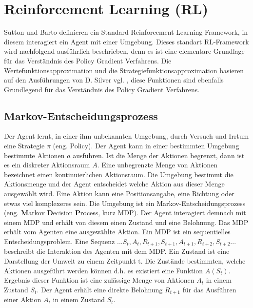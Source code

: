\documentclass[conference]{IEEEtran}
\begin{document}



\section{Reinforcement Learning (RL)}
Sutton und Barto \cite{sutton_barto_12} definieren ein Standard Reinforcement Learning Framework, in diesem interagiert ein Agent mit einer Umgebung. Dieses standart RL-Framework wird nachfolgend ausführlich beschrieben, denn es ist eine elementare Grundlage für das Verständnis des Policy Gradient Verfahrens. Die Wertefunktionsapproximation und die Strategiefunktionsapproximation basieren auf den Ausführungen von D. Silver vgl. \cite{silver_15}, diese Funktionen sind ebenfalls Grundlegend für das Verständnis des Policy Gradient Verfahrens.

\subsection{Markov-Entscheidungsprozess}
Der Agent lernt, in einer ihm unbekannten Umgebung, durch Versuch und Irrtum eine Strategie $\pi$ (eng. Policy). Der Agent kann in einer bestimmten Umgebung bestimmte Aktionen $a$ ausführen. Ist die Menge der Aktionen begrenzt, dann ist es ein diskreter Aktionsraum $A$. Eine unbegrenzte Menge von Aktionen bezeichnet einen kontinuierlichen Aktionsraum. Die Umgebung bestimmt die Aktionsmenge und der Agent entscheidet welche Aktion aus dieser Menge ausgewählt wird. Eine Aktion kann eine Positionsangabe, eine Richtung oder etwas viel komplexeres sein. Die Umgebung ist ein Markov-Entscheidungsprozess (eng. \textbf{M}arkov \textbf{D}ecision \textbf{P}rocess, kurz MDP). Der Agent interagiert demnach mit einem MDP und erhält von diesem einen Zustand und eine Belohnung. Das MDP erhält vom Agenten eine ausgewählte Aktion. Ein MDP ist ein sequentielles Entscheidungsproblem. Eine Sequenz $... S_t, A_t, R_{t+1}, S_{t+1}, A_{t+1}, R_{t+2}, S_{t+2} ...$ beschreibt die Interaktion des Agenten mit dem MDP. Ein Zustand ist eine Darstellung der Umwelt zu einem Zeitpunkt t. Die Zustände bestimmten, welche Aktionen ausgeführt werden können d.h. es existiert eine Funktion $A(S_t)$. Ergebnis dieser Funktion ist eine zulässige Menge von Aktionen $A_t$ in einem Zustand $S_t$. Der Agent erhält eine direkte Belohnung $R_{t+1}$ für das Ausführen einer Aktion $A_t$ in einem Zustand $S_t$.
\end{document}

